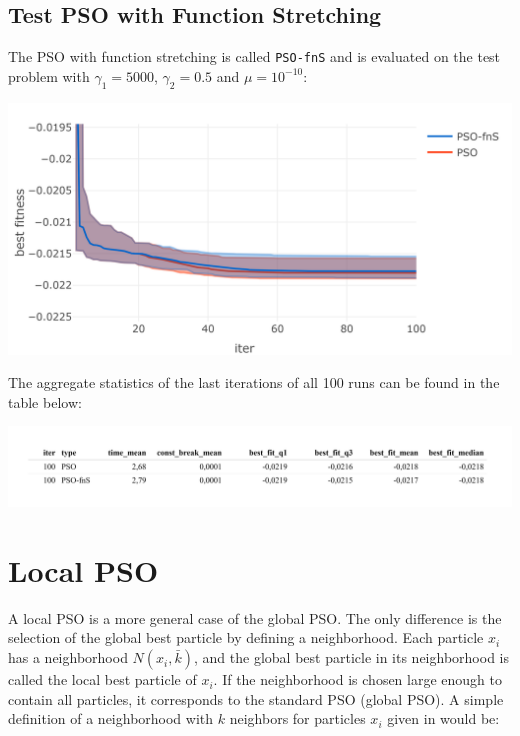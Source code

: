 \documentclass[
  oneside]{book}
\begin{document}
\hypertarget{test-pso-with-function-stretching}{%
\subsection{Test PSO with Function Stretching}\label{test-pso-with-function-stretching}}

The PSO with function stretching is called \texttt{PSO-fnS} and is evaluated on the test problem with \(\gamma_1 = 5000\), \(\gamma_2 = 0.5\) and \(\mu = 10^{-10}\):

\includegraphics{Master_Thesis_files/figure-latex/variants3-1.png}

The aggregate statistics of the last iterations of all 100 runs can be found in the table below:

\includegraphics{Master_Thesis_files/figure-latex/variants4-1.png}

\hypertarget{local-pso}{%
\section{Local PSO}\label{local-pso}}

A local PSO is a more general case of the global PSO. The only difference is the selection of the global best particle by defining a neighborhood. Each particle \(x_i\) has a neighborhood \(N(x_i, \bar{k})\), and the global best particle in its neighborhood is called the local best particle of \(x_i\). If the neighborhood is chosen large enough to contain all particles, it corresponds to the standard PSO (global PSO). A simple definition of a neighborhood with \(k\) neighbors for particles \(x_i\) given in \citep{Enge2013} would be:
\end{document}
